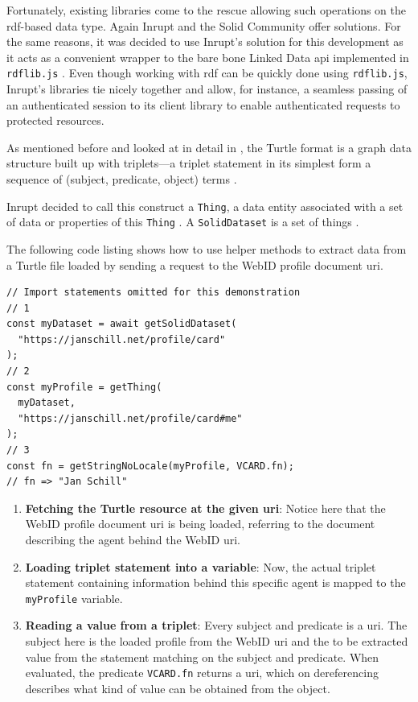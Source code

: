 Fortunately, existing libraries come to the rescue allowing such operations on the \gls{rdf}-based data type. Again Inrupt and the Solid Community offer solutions. For the same reasons, it was decided to use Inrupt's solution for this development as it acts as a convenient wrapper to the bare bone Linked Data \gls{api} implemented in \texttt{rdflib.js} \cite{rdflib-js}. Even though working with \gls{rdf} can be quickly done using \texttt{rdflib.js}, Inrupt's libraries tie nicely together and allow, for instance, a seamless passing of an authenticated session to its client library to enable authenticated requests to protected resources.

As mentioned before and looked at in detail in \cite{cern-solid-investigation-spec}, the Turtle format is a graph data structure built up with triplets---a triplet statement in its simplest form a sequence of (subject, predicate, object) terms \cite{Prud:hommeaux:14:RT}. 

Inrupt decided to call this construct a \texttt{Thing}, a data entity associated with a set of data or properties of this \texttt{Thing} \cite{inrupt-thing}. A \texttt{SolidDataset} is a set of things \cite{inrupt-dataset}.

The following code listing shows how to use helper methods to extract data from a Turtle file loaded by sending a request to the WebID profile document \gls{uri}.

\begin{lstlisting}[language=Other,columns=fullflexible, caption={Basic usage of Inrupt's solid-client library.}, label={lst:2}]
// Import statements omitted for this demonstration
// 1
const myDataset = await getSolidDataset(
  "https://janschill.net/profile/card"
);
// 2
const myProfile = getThing(
  myDataset,
  "https://janschill.net/profile/card#me"
);
// 3
const fn = getStringNoLocale(myProfile, VCARD.fn);
// fn => "Jan Schill"
\end{lstlisting}

\begin{enumerate}
    \item \textbf{Fetching the Turtle resource at the given \gls{uri}}: Notice here that the WebID profile document \gls{uri} is being loaded, referring to the document describing the agent behind the WebID \gls{uri}.
    \item \textbf{Loading triplet statement into a variable}: Now, the actual triplet statement containing information behind this specific agent is mapped to the \texttt{myProfile} variable.
    \item \textbf{Reading a value from a triplet}: Every subject and predicate is a \gls{uri}. The subject here is the loaded profile from the WebID \gls{uri} and the to be extracted value from the statement matching on the subject and predicate. When evaluated, the predicate \texttt{VCARD.fn} returns a \gls{uri}, which on dereferencing describes what kind of value can be obtained from the object.
\end{enumerate}


